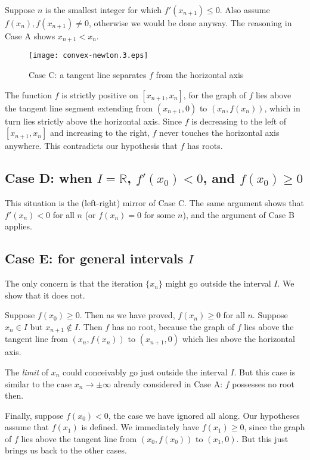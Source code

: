 \documentclass[12pt]{article}
\newcommand{\real}{\mathbb{R}}
\begin{document}
Suppose $n$ is the smallest integer
for which $f'(x_{n+1}) \leq 0$.  
Also assume $f(x_n), f(x_{n+1}) \neq 0$, otherwise we would be done anyway.
The reasoning in Case A shows $x_{n+1} < x_n$.

\begin{figure}[!htb]
\begin{center}
\texttt{[image: convex-newton.3.eps]}
\end{center}
\caption{Case C: a tangent line separates $f$ from the horizontal axis}
\end{figure}

The function $f$ is strictly positive on $[x_{n+1}, x_n]$,
for the graph of $f$ lies above the tangent line segment extending
from $(x_{n+1}, 0)$ to $(x_n, f(x_n))$, which in turn lies 
strictly above the horizontal axis.
Since $f$ is decreasing to the left of $[x_{n+1}, x_n]$
and increasing to the right, 
$f$ never touches the horizontal axis anywhere.
This contradicts our hypothesis that $f$ has roots.

\subsection*{Case D: when $I = \real$, $f'(x_0) < 0$, and $f(x_0) \geq 0$}
This situation is the (left-right) mirror 
of Case C.  The same argument shows that $f'(x_n) < 0$
for all $n$ (or $f(x_n) = 0$ for some $n$), and the
argument of Case B applies.

\subsection*{Case E: for general intervals $I$}
The only concern is that the iteration $\{ x_n \}$
might go outside the interval $I$.  We show that it does not.

Suppose $f(x_0) \geq 0$.
Then as we have proved, $f(x_n) \geq 0$ for all $n$.
Suppose $x_n \in I$ but $x_{n+1} \notin I$.
Then $f$ has no root, because the graph of $f$ lies above
the tangent line from $(x_n, f(x_n))$ to $(x_{n+1}, 0)$
which lies above the horizontal axis.

The \emph{limit} of $x_n$ could conceivably go just outside
the interval $I$.
But this case is similar to the case $x_n \to \pm \infty$
already considered in Case A:
$f$ possesses no root then.


Finally, suppose $f(x_0) < 0$, the case we have ignored all along.
Our hypotheses assume that $f(x_1)$ is defined.
We immediately have $f(x_1) \geq 0$, 
since the graph of $f$ lies above the tangent line
from $(x_0, f(x_0))$ to $(x_1, 0)$.
But this just brings us back to the other cases.
\end{document}

